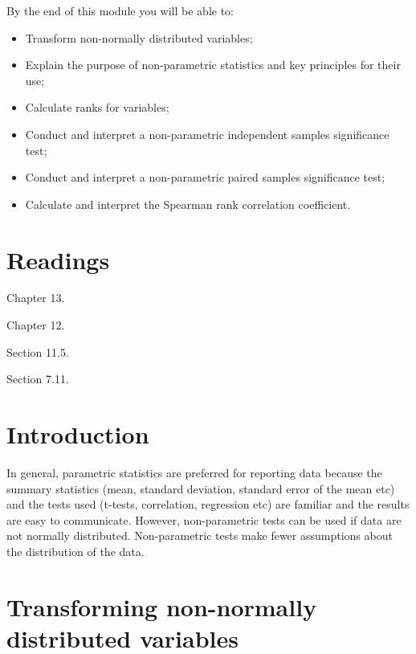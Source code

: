 \documentclass[
]{memoir}
\providecommand{\tightlist}{%
  \setlength{\itemsep}{0pt}\setlength{\parskip}{0pt}}
\begin{document}
By the end of this module you will be able to:

\begin{itemize}
\tightlist
\item
  Transform non-normally distributed variables;
\item
  Explain the purpose of non-parametric statistics and key principles for their use;
\item
  Calculate ranks for variables;
\item
  Conduct and interpret a non-parametric independent samples significance test;
\item
  Conduct and interpret a non-parametric paired samples significance test;
\item
  Calculate and interpret the Spearman rank correlation coefficient.
\end{itemize}

\hypertarget{readings-8}{%
\section*{Readings}\label{readings-8}}

\citep{kirkwood_sterne01a} Chapter 13.

\citep{bland15b} Chapter 12.

\citep{juul_frydenberg14} Section 11.5.

\citep{acock10} Section 7.11.

\hypertarget{introduction-6}{%
\section{Introduction}\label{introduction-6}}

In general, parametric statistics are preferred for reporting data because the summary statistics (mean, standard deviation, standard error of the mean etc) and the tests used (t-tests, correlation, regression etc) are familiar and the results are easy to communicate. However, non-parametric tests can be used if data are not normally distributed. Non-parametric tests make fewer assumptions about the distribution of the data.

\hypertarget{transforming-non-normally-distributed-variables}{%
\section{Transforming non-normally distributed variables}\label{transforming-non-normally-distributed-variables}}
\end{document}
